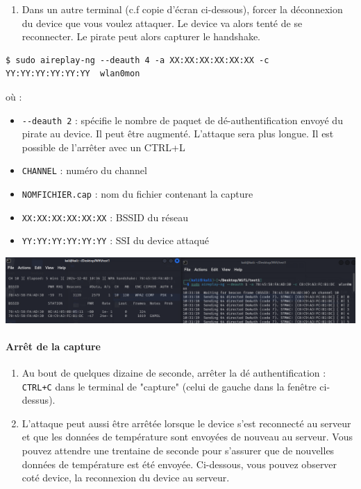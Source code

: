 \documentclass[french, 12pt]{article}%
\newcommand{\itemE}{\item[$\bullet$]}
\begin{document}
\begin{enumerate}[resume]
\item Dans un autre terminal (c.f copie d'écran ci-dessous), forcer la déconnexion du device que vous voulez attaquer. Le device va alors tenté de se reconnecter. Le pirate peut alors capturer le handshake.
\end{enumerate}

\begin{lstlisting}[style=commande]
$ sudo aireplay-ng --deauth 4 -a XX:XX:XX:XX:XX:XX -c YY:YY:YY:YY:YY:YY  wlan0mon
\end{lstlisting}
où : 
\begin{itemize}
\itemE \verb?--deauth 2? : spécifie le nombre de paquet de dé-authentification envoyé du pirate au device. Il peut être augmenté. L'attaque sera plus longue. Il est possible de l'arrêter avec un CTRL+L
\itemE \verb?CHANNEL? : numéro du channel 
\itemE \verb?NOMFICHIER.cap? : nom du fichier contenant la capture
\itemE \verb?XX:XX:XX:XX:XX:XX? : BSSID du réseau 
\itemE \verb?YY:YY:YY:YY:YY:YY? : SSI du device attaqué
\end{itemize}

\begin{center}
\includegraphics[scale=0.4]{./ressource/screenAttaque}
\end{center}


\paragraph{Arrêt de la capture}
\begin{enumerate}[resume]
\item Au bout de quelques dizaine de seconde, arrêter la dé authentification  : \verb?CTRL+C? dans le terminal de "capture" (celui de gauche dans la fenêtre ci-dessus). 

\item L'attaque peut aussi être arrêtée lorsque le device s'est reconnecté au serveur et que les données de température sont envoyées de nouveau au serveur. Vous pouvez attendre une trentaine de seconde pour s'assurer que de nouvelles données de température est été envoyée. Ci-dessous, vous pouvez observer coté device,  la reconnexion du device au serveur.
\end{enumerate}
\end{document}
